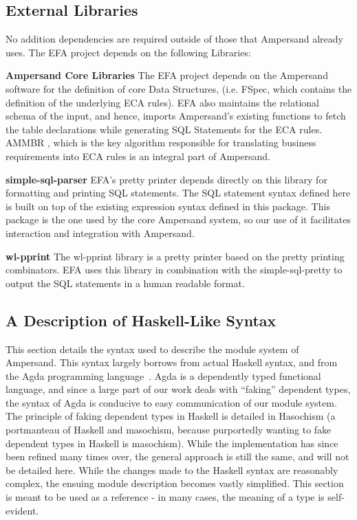 \subsection{External Libraries}
\noindent No addition dependencies are required outside of those that Ampersand 
already 
uses. The EFA project depends on the following Libraries:
\begin{description}
    \item \textbf{Ampersand Core Libraries} \newline
    The EFA project depends on the Ampersand software for the definition of 
    core Data Structures, (i.e. FSpec, which contains the definition of 
    the underlying ECA rules). EFA also maintains the relational schema of 
    the input, and hence, imports Ampersand's existing functions to fetch 
    the table declarations while generating SQL Statements for the ECA 
    rules. AMMBR \cite{AMMBR}, which is the key algorithm responsible for 
    translating business requirements into ECA rules is an integral part of 
    Ampersand.
    \item \textbf{simple-sql-parser} \newline
    EFA's pretty printer depends directly on this library for formatting 
    and printing SQL statements. The SQL statement syntax 
    defined here is built on top of the existing expression syntax defined 
    in this package. This package is the one used by the core Ampersand system,
    so our use of it facilitates interaction and integration with Ampersand. 
    \cite{simple-sql}
    \item \textbf{wl-pprint} \newline 
    The wl-pprint library\cite{wl-pprint} is a pretty printer based on the
    pretty printing combinators. EFA uses this library in combination with
    the simple-sql-pretty to output the SQL statements in a human readable
    format.
    \item 
\end{description}

\noindent
\subsection{A Description of Haskell-Like Syntax}\label{subsec:HaskellSyntax}

This section details the syntax used to describe the module system of
Ampersand. This syntax largely borrows from actual Haskell syntax, and from the
Agda programming language~\cite{agda}.
Agda is a dependently typed functional
language, and since a large part of our work deals with ``faking'' dependent
types, the syntax of Agda is conducive to easy communication of our module 
system. The
principle of faking dependent types in Haskell is detailed in
Hasochism \citep{hasochism} 
(a portmanteau of Haskell and masochism, because
purportedly wanting to fake dependent types in Haskell is masochism). While the
implementation has since been refined many times over, the general approach is 
still the
same, and will not be detailed here.
While the changes made to the Haskell syntax are reasonably complex, the 
ensuing 
module description becomes vastly simplified. This section is meant to be used
as a reference - in many cases, the meaning of a type is self-evident. 

